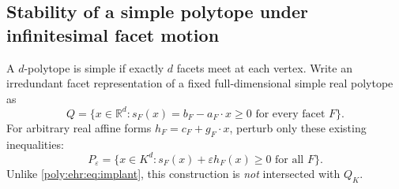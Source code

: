 \documentclass[11pt,a4paper]{article}
\numberwithin{equation}{section}
\theoremstyle{plain}
\newcommand{\R}{\mathbb R}
\newcommand{\eps}{\varepsilon}
\begin{document}
\subsection{Stability of a simple polytope under infinitesimal facet motion}

A $d$-polytope is simple if exactly $d$ facets meet at each vertex. Write
an irredundant facet representation of a fixed full-dimensional simple
real polytope as
\[
 Q=\{x\in\R^d:s_F(x)=b_F-a_F\cdot x\geq0\text{ for every facet }F\}.
\]
For arbitrary real affine forms $h_F=c_F+g_F\cdot x$, perturb only these
existing inequalities:
\begin{equation}\label{poly:ehr:eq:simple-perturb}
 P_\eps=\{x\in K^d:s_F(x)+\eps h_F(x)\geq0\text{ for all }F\}.
\end{equation}
Unlike \eqref{poly:ehr:eq:implant}, this construction is \emph{not} intersected
with $Q_K$.
\end{document}
